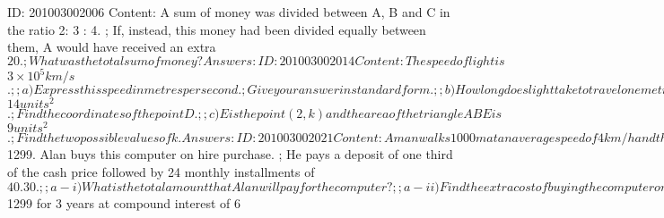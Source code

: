\documentclass{article}
\begin{document}
ID: 201003002006
Content:
A sum of money was divided between A, B and C in the ratio 2: 3 : 4. ; If, instead, this money had been divided equally between them, A would have received an extra $20. ; What was the total sum of money?Answers:

ID: 201003002014
Content:
The speed of light is $$3 \times 10^5 km/s$$.;;a) Express this speed in metres per second. ; Give your answer in standard form.;;b) How long does light take to travel one metre? Express this answer in nanoseconds.Answers:

ID: 201003002020
Content:
img;A, B and C are the points (3, 1), (6, 1) and (9, 5).;;a) Find the area of triangle ABC.;;b) ABCD is a trapezium with AB parallel to DC. The area of the trapezium is $$14 units^2$$. ; Find the coordinates of the point D.;;c) E is the point (2, k) and the area of the triangle ABE is $$9 units^2$$. ; Find the two possible values of k.Answers:

ID: 201003002021
Content:
A man walks 1000 m at an average speed of 4 km/h and then runs 1.3 km in 5 minutes. Calculate;;a) The time, in minutes, he takes to walk the 1000 m;;b) His running speed in kilometers per hour,;;c) His average speed for the whole distanceAnswers:

ID: 201004002003
Content:
a) The cash price of a new computer is $1299. Alan buys this computer on hire purchase. ; He pays a deposit of one third of the cash price followed by 24 monthly installments of $40.30.;;a-i) What is the total amount that Alan will pay for the computer?;;a-ii) Find the extra cost of buying the computer on hire purchase as a percentage of the cash price.;;b) Betty buys an identical computer. ; To pay for it, she borrows the whole cost of $1299 for 3 years at compound interest of 6%
\end{document}

